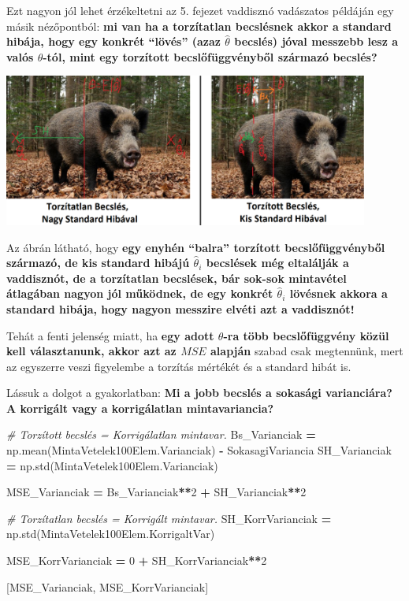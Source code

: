 \documentclass[
]{book}
\newenvironment{Shaded}{\begin{snugshade}}{\end{snugshade}}
\newcommand{\CommentTok}[1]{\textcolor[rgb]{0.56,0.35,0.01}{\textit{#1}}}
\newcommand{\DecValTok}[1]{\textcolor[rgb]{0.00,0.00,0.81}{#1}}
\newcommand{\NormalTok}[1]{#1}
\newcommand{\OperatorTok}[1]{\textcolor[rgb]{0.81,0.36,0.00}{\textbf{#1}}}
\begin{document}
Ezt nagyon jól lehet érzékeltetni az 5. fejezet vaddisznó vadászatos példáján egy másik nézőpontból: \textbf{mi van ha a torzítatlan becslésnek akkor a standard hibája, hogy egy konkrét ``lövés'' (azaz \(\hat{\theta}\) becslés) jóval messzebb lesz a valós \(\theta\)-tól, mint egy torzított becslőfüggvényből származó becslés?}

\includegraphics[width=0.9\textwidth,height=\textheight]{BiasBoarCompare.png}

Az ábrán látható, hogy \textbf{egy enyhén ``balra'' torzított becslőfüggvényből származó, de kis standard hibájú \(\hat{\theta}_i\) becslések még eltalálják a vaddisznót, de a torzítatlan becslések, bár sok-sok mintavétel átlagában nagyon jól működnek, de egy konkrét \(\hat{\theta}_i\) lövésnek akkora a standard hibája, hogy nagyon messzire elvéti azt a vaddisznót!}

Tehát a fenti jelenség miatt, ha \textbf{egy adott \(\theta\)-ra több becslőfüggvény közül kell választanunk, akkor azt az \(MSE\) alapján} szabad csak megtennünk, mert az egyszerre veszi figyelembe a torzítás mértékét és a standard hibát is.

Lássuk a dolgot a gyakorlatban: \textbf{Mi a jobb becslés a sokasági varianciára? A korrigált vagy a korrigálatlan mintavariancia?}

\begin{Shaded}
\begin{Highlighting}[]
\CommentTok{\# Torzított becslés = Korrigálatlan mintavar.}
\NormalTok{Bs\_Varianciak }\OperatorTok{=}\NormalTok{ np.mean(MintaVetelek100Elem.Varianciak) }\OperatorTok{{-}}\NormalTok{ SokasagiVariancia}
\NormalTok{SH\_Varianciak }\OperatorTok{=}\NormalTok{ np.std(MintaVetelek100Elem.Varianciak)}

\NormalTok{MSE\_Varianciak }\OperatorTok{=}\NormalTok{ Bs\_Varianciak}\OperatorTok{**}\DecValTok{2} \OperatorTok{+}\NormalTok{ SH\_Varianciak}\OperatorTok{**}\DecValTok{2}

\CommentTok{\# Torzítatlan becslés = Korrigált mintavar.}
\NormalTok{SH\_KorrVarianciak }\OperatorTok{=}\NormalTok{ np.std(MintaVetelek100Elem.KorrigaltVar)}

\NormalTok{MSE\_KorrVarianciak }\OperatorTok{=} \DecValTok{0} \OperatorTok{+}\NormalTok{ SH\_KorrVarianciak}\OperatorTok{**}\DecValTok{2}

\NormalTok{[MSE\_Varianciak, MSE\_KorrVarianciak]}
\end{Highlighting}
\end{Shaded}
\end{document}
